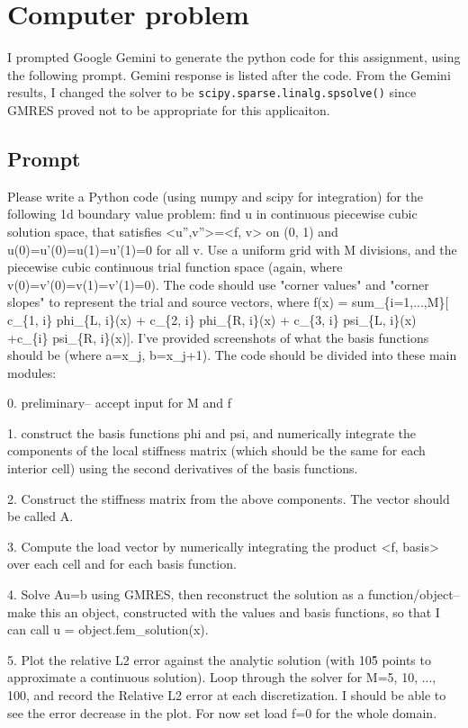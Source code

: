 \documentclass{hw-template}
\begin{document}
\section{Computer problem}

I prompted Google Gemini to generate the python code for this assignment, using the following prompt. Gemini response is listed after the code. From the Gemini results, I changed the solver to be \verb|scipy.sparse.linalg.spsolve()| since GMRES proved not to be appropriate for this applicaiton.

\subsection{Prompt}

Please write a Python code (using numpy and scipy for integration) for the following 1d boundary value problem: find u in continuous piecewise cubic solution space, that satisfies <u'',v''>=<f, v> on (0, 1) and u(0)=u'(0)=u(1)=u'(1)=0 for all v. Use a uniform grid with M divisions, and the piecewise cubic continuous trial function space (again, where v(0)=v'(0)=v(1)=v'(1)=0). The code should use "corner values" and "corner slopes" to represent the trial and source vectors, where f(x) = sum\_\{i=1,...,M\}[ c\_\{1, i\} phi\_\{L, i\}(x) + c\_\{2, i\} phi\_\{R, i\}(x) + c\_\{3, i\} psi\_\{L, i\}(x) +c\_\{i\} psi\_\{R, i\}(x)]. I've provided screenshots of what the basis functions should be (where a=x\_j, b=x\_j+1). The code should be divided into these main modules:

0. preliminary-- accept input for M and f

1. construct the basis functions phi and psi, and numerically integrate the components of the local stiffness matrix (which should be the same for each interior cell) using the second derivatives of the basis functions.

2. Construct the stiffness matrix from the above components. The vector should be called A.

3. Compute the load vector by numerically integrating the product <f, basis> over each cell and for each basis function.

4. Solve Au=b using GMRES, then reconstruct the solution as a function/object-- make this an object, constructed with the values and basis functions, so that I can call u = object.fem\_solution(x).

5. Plot the relative L2 error against the analytic solution (with 10\^5 points to approximate a continuous solution). Loop through the solver for M=5, 10, ..., 100, and record the Relative L2 error at each discretization. I should be able to see the error decrease in the plot. For now set load f=0 for the whole domain.
\end{document}
